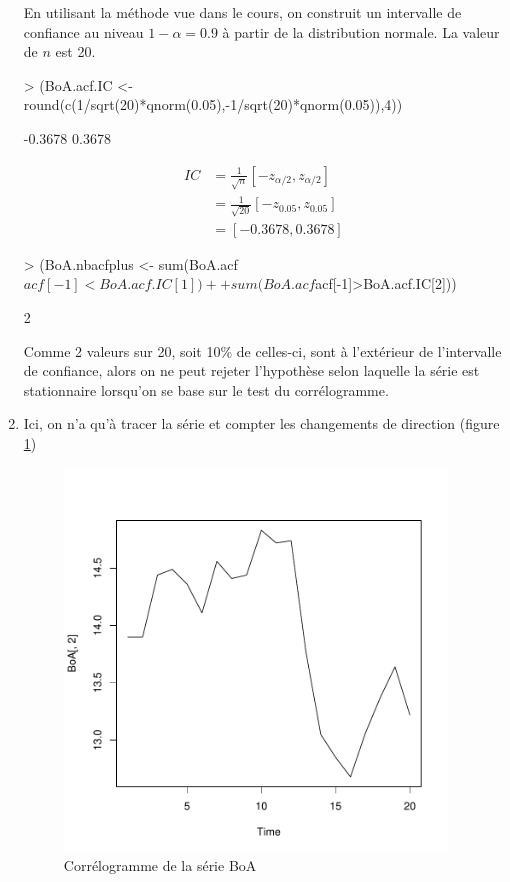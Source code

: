 \begin{solution}{1.6}
\begin{enumerate}
En utilisant la méthode vue dans le cours, on construit un intervalle de
confiance au niveau $1-\alpha=0.9$ à partir de la distribution normale. La
valeur de $n$ est 20.

\begin{Schunk}
\begin{Sinput}
> (BoA.acf.IC <- round(c(1/sqrt(20)*qnorm(0.05),-1/sqrt(20)*qnorm(0.05)),4))
\end{Sinput}
\begin{Soutput}
[1] -0.3678  0.3678
\end{Soutput}
\end{Schunk}

\begin{align*}
IC &= \frac{1}{\sqrt{n}}\left[-z_{\alpha / 2},z_{\alpha / 2} \right] \\
&= \frac{1}{\sqrt{20}}\left[-z_{0.05},z_{0.05} \right] \\
&= \left[ -0.3678,0.3678 \right]
\end{align*}

\begin{Schunk}
\begin{Sinput}
> (BoA.nbacfplus <- sum(BoA.acf$acf[-1]<BoA.acf.IC[1]) +
+    sum(BoA.acf$acf[-1]>BoA.acf.IC[2]))
\end{Sinput}
\begin{Soutput}
[1] 2
\end{Soutput}
\end{Schunk}
Comme 2 valeurs sur 20, soit 10\% de celles-ci, sont à l'extérieur de
l'intervalle de confiance, alors on ne peut rejeter l'hypothèse selon laquelle la
série est stationnaire lorsqu'on se base sur le test du corrélogramme.
\item
Ici, on n'a qu'à tracer la série et compter les changements de direction
(figure \ref{fig:exercice1.6-graph2})
\begin{figure}[!ht]
\centering
\includegraphics[height=4in, width=4in]{exercice1-6-graph2}
\caption{Corrélogramme de la série BoA}
\label{fig:exercice1.6-graph2}
\end{figure}


\end{enumerate}
\end{solution}
